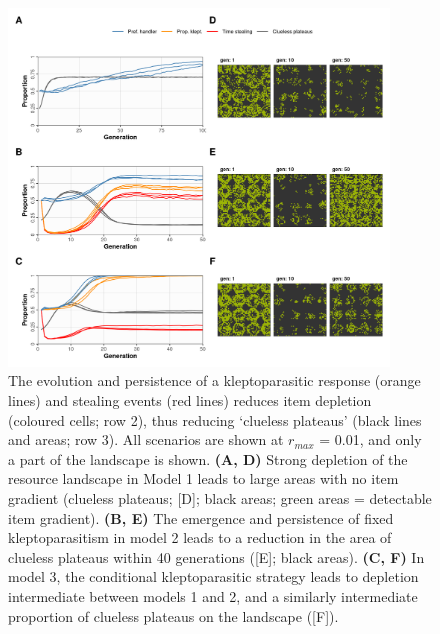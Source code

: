 \documentclass[11pt]{article}
\begin{document}
\begin{figure}[h!]
    \centering
    \includegraphics[width=0.90\textwidth]{figures/fig_08.png}
    \caption{
        The evolution and persistence of a kleptoparasitic response (orange lines) and stealing events (red lines) reduces item depletion (coloured cells; row 2), thus reducing `clueless plateaus' (black lines and areas; row 3). All scenarios are shown at $r_{max}$ = 0.01, and only a part of the landscape is shown.
        \textbf{(A, D)} Strong depletion of the resource landscape in Model 1 leads to large areas with no item gradient (clueless plateaus; [D]; black areas; green areas = detectable item gradient).
        \textbf{(B, E)} The emergence and persistence of fixed kleptoparasitism in model 2 leads to a reduction in the area of clueless plateaus within 40 generations ([E]; black areas).
        \textbf{(C, F)} In model 3, the conditional kleptoparasitic strategy leads to depletion intermediate between models 1 and 2, and a similarly intermediate proportion of clueless plateaus on the landscape ([F]).
    }
    \label{Fig:CluelessLandscape}
\end{figure}
\end{document}
